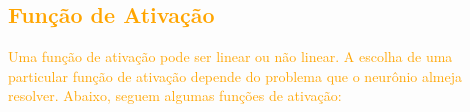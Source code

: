 \documentclass{automatextcc}
\newcommand{\nico}[1]{\textcolor{orange}{#1}}
\newcommand{\pumi}[1]{\textcolor{red}{#1}}
\begin{document}
\subsection{\nico{Função de Ativação}}
\nico{
Uma função de ativação pode ser linear ou não linear. A escolha de uma particular função de ativação depende do problema que o neurônio almeja resolver. Abaixo, seguem algumas funções de ativação:}


\end{document}
